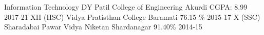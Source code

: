 

\begin{cvhonors}

  \cvhonor
    {Information Technology} %
    {DY Patil College of Engineering Akurdi} %
    {CGPA: 8.99} %
    {2017-21} %
  \cvhonor
    {XII (HSC)} %
    {Vidya Pratisthan College Baramati} %
    {76.15 \%} %
    {2015-17} %
  \cvhonor
    {X (SSC)} %
    {Sharadabai Pawar Vidya Niketan Shardanagar} %
    {91.40\%} %
    {2014-15} %

\end{cvhonors}
